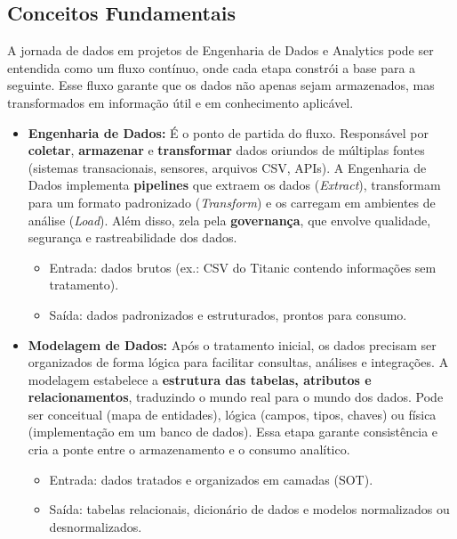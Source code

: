 \documentclass[12pt,a4paper]{article}
\begin{document}
\subsection{Conceitos Fundamentais}

A jornada de dados em projetos de Engenharia de Dados e Analytics pode ser entendida como um fluxo contínuo, onde cada etapa constrói a base para a seguinte. 
Esse fluxo garante que os dados não apenas sejam armazenados, mas transformados em informação útil e em conhecimento aplicável.

\begin{itemize}
    \item \textbf{Engenharia de Dados:} 
    É o ponto de partida do fluxo. Responsável por \textbf{coletar}, \textbf{armazenar} e \textbf{transformar} dados oriundos de múltiplas fontes (sistemas transacionais, sensores, arquivos CSV, APIs). 
    A Engenharia de Dados implementa \textbf{pipelines} que extraem os dados (\textit{Extract}), transformam para um formato padronizado (\textit{Transform}) e os carregam em ambientes de análise (\textit{Load}). 
    Além disso, zela pela \textbf{governança}, que envolve qualidade, segurança e rastreabilidade dos dados.
    
    \begin{itemize}
        \item Entrada: dados brutos (ex.: CSV do Titanic contendo informações sem tratamento).
        \item Saída: dados padronizados e estruturados, prontos para consumo.
    \end{itemize}

    \item \textbf{Modelagem de Dados:} 
    Após o tratamento inicial, os dados precisam ser organizados de forma lógica para facilitar consultas, análises e integrações. 
    A modelagem estabelece a \textbf{estrutura das tabelas, atributos e relacionamentos}, traduzindo o mundo real para o mundo dos dados. 
    Pode ser conceitual (mapa de entidades), lógica (campos, tipos, chaves) ou física (implementação em um banco de dados). 
    Essa etapa garante consistência e cria a ponte entre o armazenamento e o consumo analítico.
    
    \begin{itemize}
        \item Entrada: dados tratados e organizados em camadas (SOT).
        \item Saída: tabelas relacionais, dicionário de dados e modelos normalizados ou desnormalizados.
    \end{itemize}


\end{itemize}
\end{document}

